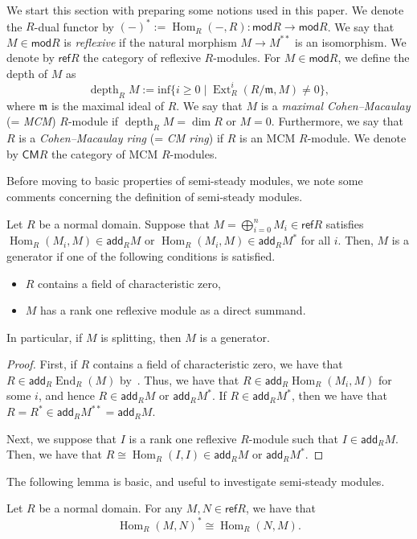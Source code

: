 \documentclass[ALCO,ThmDefs,Unicode]{cedram}
\newcommand{\fkm}{\mathfrak{m}}
\DeclareMathOperator{\depth}{depth}
\DeclareMathOperator{\Ext}{Ext}
\DeclareMathOperator{\Hom}{Hom}
\DeclareMathOperator{\End}{End}
\newcommand{\add}{\mathsf{add}}
\newcommand{\CM}{\mathsf{CM}}
\newcommand{\mc}{\mathsf{mod}}
\newcommand{\refl}{\mathsf{ref}}
\begin{document}
We start this section with preparing some notions used in this paper. We denote the $R$-dual functor by $(-)^*:=\Hom_R(-, R) : \mc R\rightarrow \mc R$. We say that $M\in \mc R$ is \emph{reflexive} if the natural morphism $M\rightarrow M^{**}$ is an isomorphism. We denote by $\refl R$ the category of reflexive $R$-modules. For $M\in\mc R$, we define the depth of $M$ as
\[
\depth_RM:=\mathrm{inf} \{ i\ge0 \mid \Ext^i_R(R/\fkm, M)\neq 0\},
\]
where $\fkm$ is the maximal ideal of $R$. We say that $M$ is a \emph{maximal Cohen--Macaulay} (= \emph{MCM}) $R$-module if $\depth_RM=\dim R$ or $M=0$. Furthermore, we say that $R$ is a \emph{Cohen--Macaulay ring} (= \emph{CM ring}) if $R$ is an MCM $R$-module. We denote by $\CM R$ the category of MCM $R$-modules.


Before moving to basic properties of semi-steady modules, we note some comments concerning the definition of semi-steady modules.

\goodbreak
\begin{lemm}\label{prop_semisteady}
Let $R$ be a normal domain. Suppose that $M=\bigoplus_{i=0}^nM_i\in\refl R$ satisfies $\Hom_R(M_i,M)\in\add_RM$ or $\Hom_R(M_i,M)\in\add_RM^*$ for all $i$. Then, $M$ is a generator if one of the following conditions is satisfied.
\begin{itemize}%
\item $R$ contains a field of characteristic zero,
\item $M$ has a rank one reflexive module as a direct summand.
\end{itemize}
In particular, if $M$ is splitting, then $M$ is a generator.
\end{lemm}

\begin{proof}
First, if $R$ contains a field of characteristic zero, we have that $R\in\add_R\End_R(M)$ by~\cite[5.6]{Aus3}. Thus, we have that $R\in\add_R\Hom_R(M_i,M)$ for some $i$, and hence $R\in\add_RM$ or $\add_RM^*$. If $R\in\add_RM^*$, then we have that $R=R^*\in\add_RM^{**}=\add_RM$.

Next, we suppose that $I$ is a rank one reflexive $R$-module such that $I\in\add_R M$. Then, we have that $R\cong\Hom_R(I, I)\in\add_RM$ or $\add_RM^*$.
\end{proof}

The following lemma is basic, and useful to investigate semi-steady modules.

\begin{lemm}\label{basic_lem_ref}
Let $R$ be a normal domain. For any $M, N\in\refl R$, we have that
\[
\Hom_R(M,N)^*\cong\Hom_R(N,M).
\]
\end{lemm}
\end{document}
